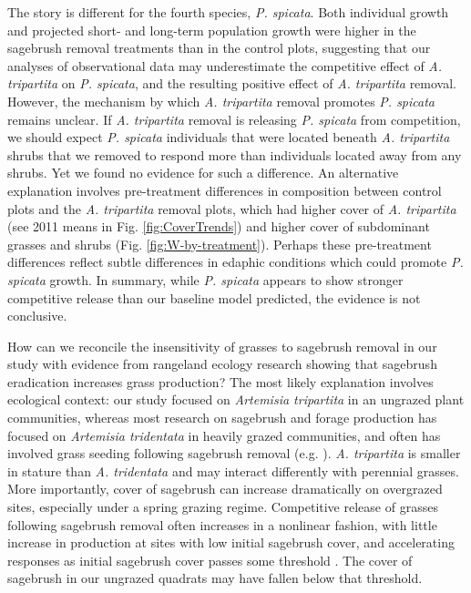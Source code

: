 \documentclass[11pt]{article}
\begin{document}
\begin{doublespacing}
The story is different for the fourth species, \textit{P. spicata}. Both individual growth and projected short- and long-term population 
growth were higher in the sagebrush removal treatments than in the control plots, suggesting that our analyses of observational data may 
underestimate the competitive effect of \textit{A. tripartita} on \textit{P. spicata}, and the resulting positive effect of \textit{A. tripartita} 
removal. However, the mechanism by which \textit{A. tripartita} removal promotes \textit{P. spicata} remains unclear. If  \textit{A. tripartita} 
removal is releasing \textit{P. spicata} from competition, we should expect \textit{P. spicata} individuals that were located beneath \textit{A. tripartita} 
shrubs that we removed to respond more than individuals located away from any shrubs. Yet we found no evidence for such a difference. 
An alternative explanation involves pre-treatment differences in composition between control plots and  the \textit{A. tripartita} 
removal plots, which had higher cover of \textit{A. tripartita} (see 2011 means in Fig. \ref{fig:CoverTrends}) and higher cover of subdominant 
grasses and shrubs (Fig. \ref{fig:W-by-treatment}). Perhaps these pre-treatment differences reflect subtle differences in 
edaphic conditions which could promote \textit{P. spicata} growth. In summary, while \textit{P. spicata} appears to 
show stronger competitive release than our baseline model predicted, the evidence is not conclusive. 

How can we reconcile the insensitivity of grasses to sagebrush removal in our study with evidence from rangeland ecology 
research showing that sagebrush eradication increases grass production? The most likely explanation involves ecological context: our 
study focused on \textit{Artemisia tripartita} in an ungrazed plant communities, whereas most research on sagebrush 
and forage production has focused on \textit{Artemisia tridentata} in heavily grazed communities, and often has involved grass seeding 
following sagebrush removal (e.g. \citealt{Cook1963}). \textit{A. tripartita} is smaller in stature than \textit{A. tridentata} 
and may interact differently with perennial grasses. More importantly, cover of sagebrush can increase dramatically on overgrazed sites, 
especially under a spring grazing regime. Competitive release of grasses following sagebrush removal often increases in 
a nonlinear fashion, with little increase in production at sites with low initial sagebrush cover, 
and accelerating responses as initial sagebrush cover passes some threshold \citep{McDaniel2005}. The cover of 
sagebrush in our ungrazed quadrats may have fallen below that threshold. 


\end{doublespacing}
\end{document}
